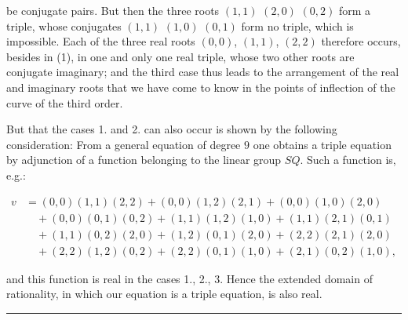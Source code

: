 be conjugate pairs. But then the three roots $(1,1)$ $(2,0)$ $(0,2)$ form a triple, whose conjugates $(1,1)$ $(1,0)$ $(0,1)$ form no triple, which is impossible. Each of the three real roots $(0,0)$, $(1,1)$, $(2,2)$ therefore occurs, besides in (1), in one and only one real triple, whose two other roots are conjugate imaginary; and the third case thus leads to the arrangement of the real and imaginary roots that we have come to know in the points of inflection of the curve of the third order.

But that the cases 1. and 2. can also occur is shown by the following consideration: From a general equation of degree $9$ one obtains a triple equation by adjunction of a function belonging to the linear group $SQ$. Such a function is, e.g.:

\[
\begin{aligned}
v &= (0,0)(1,1)(2,2) + (0,0)(1,2)(2,1) + (0,0)(1,0)(2,0) \\
&\quad + (0,0)(0,1)(0,2) + (1,1)(1,2)(1,0) + (1,1)(2,1)(0,1) \\
&\quad + (1,1)(0,2)(2,0) + (1,2)(0,1)(2,0) + (2,2)(2,1)(2,0) \\
&\quad + (2,2)(1,2)(0,2) + (2,2)(0,1)(1,0) + (2,1)(0,2)(1,0),
\end{aligned}
\]

and this function is real in the cases 1., 2., 3. Hence the extended domain of rationality, in which our equation is a triple equation, is also real.

\begin{center}
\rule{0.22\textwidth}{0.4pt}
\end{center}
